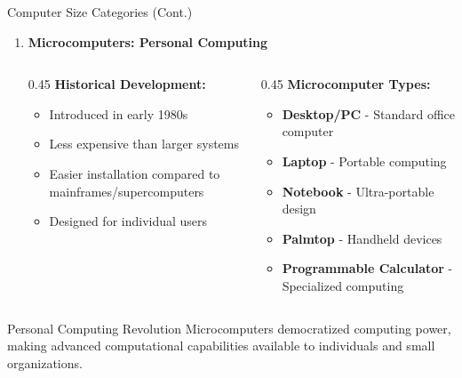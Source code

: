 \documentclass[aspectratio=169]{beamer}
\begin{document}
\begin{frame}{
Computer Size Categories (Cont.)}
    \begin{enumerate}
        \item[4.] \textbf{Microcomputers: Personal Computing}

\begin{columns}
        \begin{column}{0.45\textwidth}
            \textbf{Historical Development:}
            \begin{itemize}
                \item Introduced in early 1980s
                \item Less expensive than larger systems
                \item Easier installation compared to mainframes/supercomputers
                \item Designed for individual users
            \end{itemize}
            
            
        \end{column}
        \begin{column}{0.45\textwidth}
            \textbf{Microcomputer Types:}
            \begin{itemize}
                \item \textbf{Desktop/PC} - Standard office computer
                \item \textbf{Laptop} - Portable computing
                \item \textbf{Notebook} - Ultra-portable design
                \item \textbf{Palmtop} - Handheld devices
                \item \textbf{Programmable Calculator} - Specialized computing
            \end{itemize}
        \end{column}
    \end{columns}
        
    \end{enumerate} 
    \begin{alertblock}{Personal Computing Revolution}
        Microcomputers democratized computing power, making advanced computational capabilities available to individuals and small organizations.
    \end{alertblock}
\end{frame}
\end{document}
